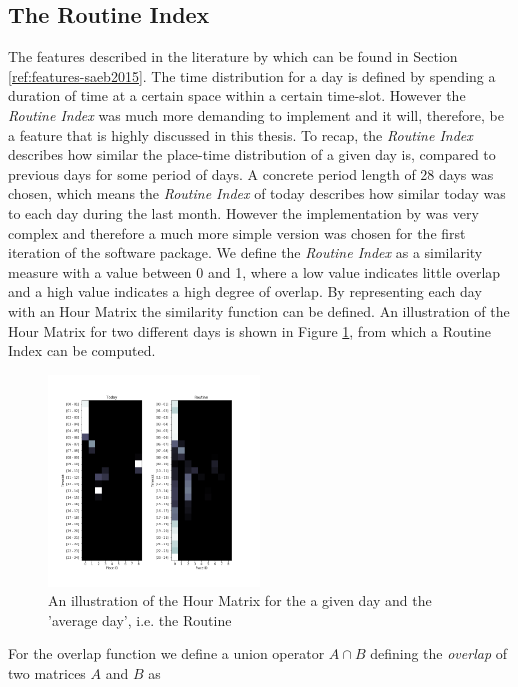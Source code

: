 \subsection{The Routine Index}
The features described in the literature by \cite{Saeb2015} which can be found in Section \ref{ref:features-saeb2015}. The time distribution for a day is defined by spending a duration of time at a certain space within a certain time-slot.  However the \textit{Routine Index} \cite{Saeb2015, Canzian2015} was much more demanding to implement and it will, therefore, be a feature that is highly discussed in this thesis. To recap, the \textit{Routine Index} describes how similar the place-time distribution of a given day is, compared to previous days for some period of days. A concrete period length of 28 days was chosen, which means the \textit{Routine Index} of today describes how similar today was to each day during the last month. However the implementation by \cite{Canzian2015} was very complex and therefore a much more simple version was chosen for the first iteration of the software package. We define the \textit{Routine Index} as a similarity measure with a value between 0 and 1, where a low value indicates little overlap and a high value indicates a high degree of overlap. By representing each day with an Hour Matrix the similarity function can be defined. An illustration of the Hour Matrix for two different days is shown in Figure \ref{fig:routine-matrix}, from which a Routine Index can be computed.

\begin{figure}
    \centering
    \includegraphics[width=0.5\textwidth]{images/routine.png}
    \caption{An illustration of the Hour Matrix for the a given day and the 'average day', i.e. the Routine}
    \label{fig:routine-matrix}
\end{figure}

For the overlap function we define a union operator $A \cap B$ defining the \textit{overlap} of two matrices $A$ and $B$ as 

